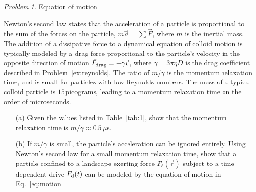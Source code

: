 \documentclass[preprint,showpacs,preprintnumbers,amsmath,amssymb,aps,prb]{revtex4-1}
\theoremstyle{remark}
\newtheorem{problem}{Problem}
\begin{document}
\begin{problem}{Equation of motion}
  \label{ex:n2l}

\noindent Newton's second law states that
  the acceleration of a particle 
  is proportional to 
  the sum of the forces on the particle, $m \vec{a} = \sum \vec{F}$,
  where $m$ is the
  inertial mass.  
  The addition of a dissipative force to a dynamical equation 
  of colloid motion 
  is typically modeled
  by a drag force proportional to the particle's velocity
  in the opposite direction of motion 
  $\vec{F}_{\rm drag} = - \gamma \vec{v}$,
  where $\gamma = 3 \pi \eta D$ is the drag coefficient
  described in Problem~\ref{ex:reynolds}.
  The ratio of $m/\gamma$ is 
 the momentum relaxation time,
  and is small for
  particles with low Reynolds numbers.
  The mass of a
  typical colloid particle is $15$\,picograms,
  leading to a momentum relaxation time
  on the order of microseconds.

\begin{enumerate}

\item [(a)] Given  the values listed in Table~\ref{tab:1},
 show that  the momentum relaxation time is 
  $m/\gamma \approx 0.5\,\mu$s. 
  
\item [(b)] If $m/\gamma$ is small, the
  particle's acceleration can be ignored
  entirely.
Using Newton's second law for
  a small momentum relaxation time, 
  show that a particle confined to a landscape exerting force
  $F_\ell(\vec{r})$ subject to a time dependent drive $F_{\rm d}(t)$
  can be modeled by the equation of motion  in 
  Eq.~\eqref{eq:motion}.
  \end{enumerate}
\end{problem}

\end{document}
